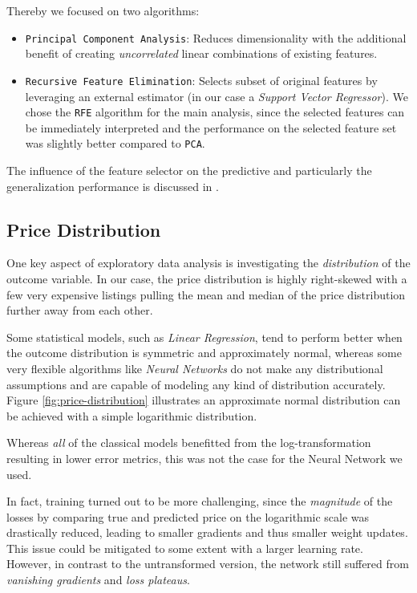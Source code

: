 Thereby we focused on two algorithms:
\begin{itemize}
    \item \texttt{Principal Component Analysis}:
          Reduces dimensionality with the additional benefit of creating \emph{uncorrelated} linear combinations of existing features.
    \item \texttt{Recursive Feature Elimination}:
          Selects subset of original features by leveraging an external estimator (in our case a \emph{Support Vector Regressor}).
          We chose the \texttt{RFE} algorithm for the main analysis, since the selected features can be immediately interpreted and the performance on the selected feature set was slightly better compared to \texttt{PCA}.

\end{itemize}

The influence of the feature selector on the predictive and particularly the generalization performance is discussed in .

\subsection{Price Distribution} \label{appendix:price-distribution}

One key aspect of exploratory data analysis is investigating the \emph{distribution} of the outcome variable.
In our case, the price distribution is highly right-skewed with a few very expensive listings pulling the mean and median of the price distribution further away from each other.

Some statistical models, such as \emph{Linear Regression}, tend to perform better when the outcome distribution is symmetric and approximately normal, whereas some very flexible algorithms like \emph{Neural Networks} do not make any distributional assumptions and are capable of modeling any kind of distribution accurately.
Figure \ref{fig:price-distribution} illustrates an approximate normal distribution can be achieved with a simple logarithmic distribution.

Whereas \emph{all} of the classical models benefitted from the log-transformation resulting in lower error metrics, this was not the case for the Neural Network we used.

In fact, training turned out to be more challenging, since the \emph{magnitude} of the losses by comparing true and predicted price on the logarithmic scale was drastically reduced, leading to smaller gradients and thus smaller weight updates.
This issue could be mitigated to some extent with a larger learning rate.
However, in contrast to the untransformed version, the network still suffered from \emph{vanishing gradients} and \emph{loss plateaus}.

